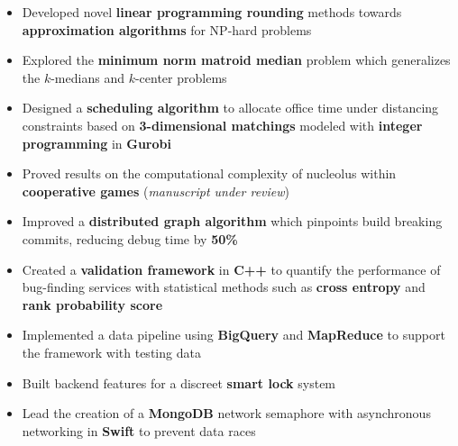 \documentclass[11pt,a4paper]{altacv}
\begin{document}
\begin{paracol}{2}
\makecvheader

\begin{itemize}
    \item Developed novel \textbf{linear programming rounding} methods
      towards \textbf{approximation algorithms} for NP-hard problems
    \item Explored the \textbf{minimum norm matroid median} problem
      which generalizes the $k$-medians and $k$-center problems
\end{itemize}

\divider %

\begin{itemize}
    \item Designed a \textbf{scheduling algorithm} to allocate office time under distancing constraints
      based on \textbf{3-dimensional matchings} modeled with \textbf{integer programming} in \textbf{Gurobi}
    \item Proved results on the computational complexity of nucleolus
      within \textbf{cooperative games}
      (\emph{manuscript under review})
\end{itemize}

\divider

\begin{itemize}
    \item Improved a \textbf{distributed graph algorithm} which pinpoints build breaking commits,
      reducing debug time by \textbf{50\%}
    \item Created a \textbf{validation framework} in \textbf{C++}
      to quantify the performance of bug-finding services
      with statistical methods such as \textbf{cross entropy} and \textbf{rank probability score}
    \item Implemented a data pipeline using \textbf{BigQuery} and \textbf{MapReduce}
      to support the framework with testing data
\end{itemize}

\divider

\begin{itemize}
    \item Built backend features for a discreet \textbf{smart lock} system
    \item Lead the creation of a \textbf{MongoDB} network semaphore with asynchronous networking in \textbf{Swift}
      to prevent data races
\end{itemize}


\end{paracol}
\end{document}
